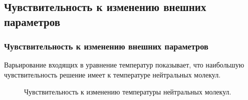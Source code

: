 \documentclass[9pt, apectratio=43,unicode]{beamer}
\begin{document}
\subsection{Чувствительность к изменению внешних параметров}
\begin{frame}\frametitle{Чувствительность к изменению внешних параметров}

Варьирование входящих в уравнение температур показывает, что наибольшую чувствительность решение имеет к температуре нейтральных молекул.

\begin{figure}
\caption{Чувствительность к изменению температуры нейтральных молекул.}
\end{figure}
\end{frame}
\end{document}
